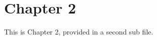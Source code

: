 \documentclass[main.tex]{subfiles}
\begin{document}
\section{Chapter 2}

This is Chapter 2, provided in a second sub file. 
\end{document}
